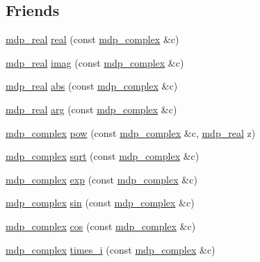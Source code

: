 \subsection*{Friends}
\begin{DoxyCompactItemize}
\item 
\hyperlink{mdp__global__vars_8h_a049e4c1d4e74d644878a42f9909463e4}{mdp\_\-real} \hyperlink{classmdp__complex_ac1595428e446b7ae72e170eabfd8b94f}{real} (const \hyperlink{classmdp__complex}{mdp\_\-complex} \&c)
\item 
\hyperlink{mdp__global__vars_8h_a049e4c1d4e74d644878a42f9909463e4}{mdp\_\-real} \hyperlink{classmdp__complex_a8a04c5512f11ace74b3f0a259c6be300}{imag} (const \hyperlink{classmdp__complex}{mdp\_\-complex} \&c)
\item 
\hyperlink{mdp__global__vars_8h_a049e4c1d4e74d644878a42f9909463e4}{mdp\_\-real} \hyperlink{classmdp__complex_a96b9b3b51ad22585b81f00888633ca37}{abs} (const \hyperlink{classmdp__complex}{mdp\_\-complex} \&c)
\item 
\hyperlink{mdp__global__vars_8h_a049e4c1d4e74d644878a42f9909463e4}{mdp\_\-real} \hyperlink{classmdp__complex_ab34d0f24b00ee0467009d6cb6c992ae1}{arg} (const \hyperlink{classmdp__complex}{mdp\_\-complex} \&c)
\item 
\hyperlink{classmdp__complex}{mdp\_\-complex} \hyperlink{classmdp__complex_ab20fc6334d41fa698d4ab5c4d83386b7}{pow} (const \hyperlink{classmdp__complex}{mdp\_\-complex} \&c, \hyperlink{mdp__global__vars_8h_a049e4c1d4e74d644878a42f9909463e4}{mdp\_\-real} z)
\item 
\hyperlink{classmdp__complex}{mdp\_\-complex} \hyperlink{classmdp__complex_ab967861ba5a992ba73f0aad6e6a80def}{sqrt} (const \hyperlink{classmdp__complex}{mdp\_\-complex} \&c)
\item 
\hyperlink{classmdp__complex}{mdp\_\-complex} \hyperlink{classmdp__complex_a0ea103d549cac56c68b3cd38bb9d9ff2}{exp} (const \hyperlink{classmdp__complex}{mdp\_\-complex} \&c)
\item 
\hyperlink{classmdp__complex}{mdp\_\-complex} \hyperlink{classmdp__complex_ab01054c3b4d1c10d13833c8d069a09f6}{sin} (const \hyperlink{classmdp__complex}{mdp\_\-complex} \&c)
\item 
\hyperlink{classmdp__complex}{mdp\_\-complex} \hyperlink{classmdp__complex_a8829f2575ae9740dcf980ca42a9b1076}{cos} (const \hyperlink{classmdp__complex}{mdp\_\-complex} \&c)
\item 
\hyperlink{classmdp__complex}{mdp\_\-complex} \hyperlink{classmdp__complex_a4c38de484596ed698718b739631e4256}{times\_\-i} (const \hyperlink{classmdp__complex}{mdp\_\-complex} \&c)

\end{DoxyCompactItemize}
